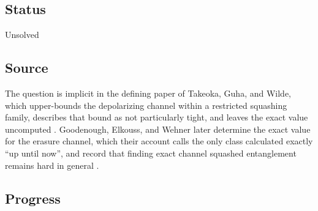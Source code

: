 \subsection*{Status}

Unsolved

\subsection*{Source}

The question is implicit in the defining paper of Takeoka, Guha, and Wilde,
which upper-bounds the depolarizing channel within a restricted squashing
family, describes that bound as not particularly tight, and leaves the exact
value uncomputed .  Goodenough,
Elkouss, and Wehner later determine the exact value for the erasure channel,
which their account calls the only class calculated exactly ``up until
now'',
and record that finding exact channel squashed entanglement remains hard in
general
.

\subsection*{Progress}

